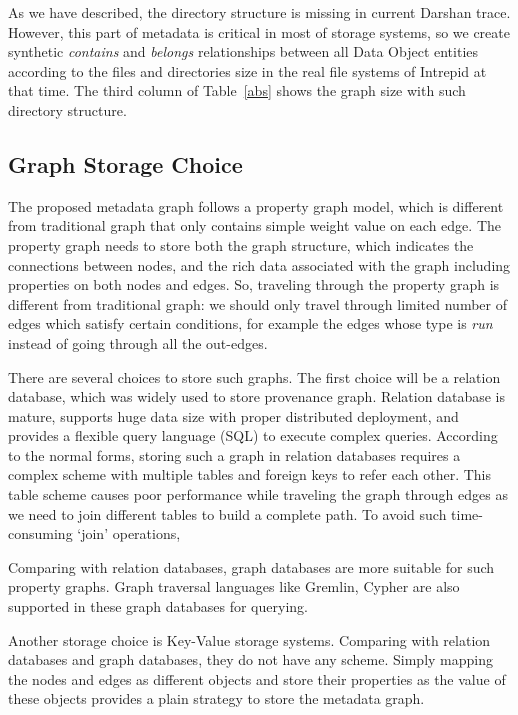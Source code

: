As we have described, the directory structure is missing in current Darshan trace. However, this part of metadata is critical in most of storage systems, so we create synthetic \textit{contains} and \textit{belongs} relationships between all Data Object entities according to the files and directories size in the real file systems of Intrepid at that time. The third column of Table~\ref{abs} shows the graph size with such directory structure.

\subsection{Graph Storage Choice}
The proposed metadata graph follows a property graph model, which is different from traditional graph that only contains simple weight value on each edge. The property graph needs to store both the graph structure, which indicates the connections between nodes, and the rich data associated with the graph including properties on both nodes and edges. So, traveling through the property graph is different from traditional graph: we should only travel through limited number of edges which satisfy certain conditions, for example the edges whose type is \textit{run} instead of going through all the out-edges. 

There are several choices to store such graphs. The first choice will be a relation database, which was widely used to store provenance graph. Relation database is mature, supports huge data size with proper distributed deployment, and provides a flexible query language (SQL) to execute complex queries. According to the normal forms, storing such a graph in relation databases requires a complex scheme with multiple tables and foreign keys to refer each other. This table scheme causes poor performance while traveling the graph through edges as we need to join different tables to build a complete path. To avoid such time-consuming `join' operations, 

Comparing with relation databases, graph databases are more suitable for such property graphs. Graph traversal languages like Gremlin, Cypher are also supported in these graph databases for querying. 

Another storage choice is Key-Value storage systems. Comparing with relation databases and graph databases, they do not have any scheme. Simply mapping the nodes and edges as different objects and store their properties as the value of these objects provides a plain strategy to store the metadata graph. 

